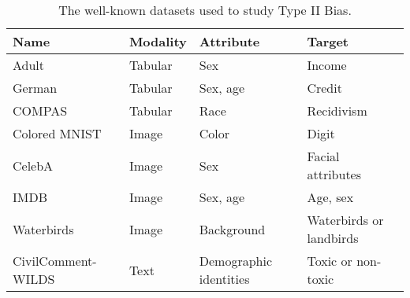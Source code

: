 \begin{table*}[htbp]
\centering
   \caption{The well-known datasets used to study Type II Bias.}
   \label{tab:datasets_II}

\begin{tabular}{llll}
\toprule
Name                                                  & Modality & Attribute              & Target                                \\
\midrule
Adult~\cite{adult_dataset_and_german_dataset}         & Tabular   & Sex                    & Income                                \\
German~\cite{adult_dataset_and_german_dataset}        & Tabular   & Sex, age               & Credit                                \\
COMPAS~\cite{COMPAS}                                  & Tabular   & Race                   & Recidivism                            \\
Colored MNIST~\cite{learn_not_to_learn_Colored_MNIST} & Image    & Color                  & Digit                                \\
CelebA~\cite{CelebA}                                  & Image    & Sex                    & Facial attributes                     \\
IMDB~\cite{IMDB}                                      & Image    & Sex, age               & Age, sex                              \\
Waterbirds~\cite{Group_DRO}                           & Image    & Background             & Waterbirds or landbirds               \\
CivilComment-WILDS~\cite{Wilds}                       & Text     & Demographic identities & Toxic or non-toxic \\
\bottomrule
\end{tabular}


   
\end{table*}

